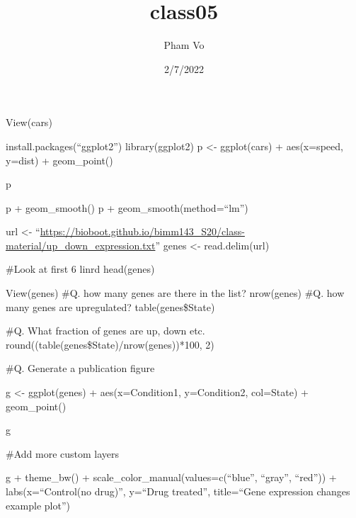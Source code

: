 \documentclass[
]{article}
\title{class05}
\author{Pham Vo}
\date{2/7/2022}
\begin{document}
\maketitle

View(cars)

install.packages(``ggplot2'') library(ggplot2) p \textless- ggplot(cars)
+ aes(x=speed, y=dist) + geom\_point()

p

p + geom\_smooth() p + geom\_smooth(method=``lm'')

url \textless-
``\url{https://bioboot.github.io/bimm143_S20/class-material/up_down_expression.txt}''
genes \textless- read.delim(url)

\#Look at first 6 linrd head(genes)

View(genes) \#Q. how many genes are there in the list? nrow(genes) \#Q.
how many genes are upregulated? table(genes\$State)

\#Q. What fraction of genes are up, down etc.
round((table(genes\$State)/nrow(genes))*100, 2)

\#Q. Generate a publication figure

g \textless- ggplot(genes) + aes(x=Condition1, y=Condition2, col=State)
+ geom\_point()

g

\#Add more custom layers

g + theme\_bw() + scale\_color\_manual(values=c(``blue'', ``gray'',
``red'')) + labs(x=``Control(no drug)'', y=``Drug treated'',
title=``Gene expression changes example plot'')
\end{document}
